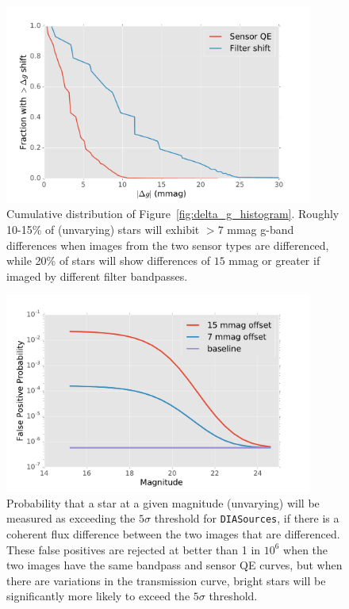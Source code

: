 \documentclass[12pt]{article}
\newcommand{\code}[1]{\texttt{#1}}
\newcommand{\DIASources}{\code{DIASources}\xspace}
\begin{document}
\begin{figure}
\includegraphics[width=0.9\textwidth]{figures/delta_g_cumulative.pdf}
\caption{Cumulative distribution of Figure~\ref{fig:delta_g_histogram}. Roughly
10-15\% of (unvarying) stars will exhibit $>7$ mmag g-band differences when
images from the two sensor types are differenced, while 20\% of stars will show
differences of $15$ mmag or greater if imaged by different filter bandpasses.
\label{fig:delta_g_cumulative}}
\end{figure}


\begin{figure}
\includegraphics[width=0.9\textwidth]{figures/false_positive_prob.pdf}
\caption{Probability that a star at a given magnitude (unvarying) will be
measured as exceeding the $5\sigma$ threshold for \DIASources, if there is a
coherent flux difference between the two images that are differenced. These
false positives are rejected at better than 1 in $10^6$ when the two images have
the same bandpass and sensor QE curves, but when there are variations in the
transmission curve, bright stars will be significantly more likely to exceed the
$5\sigma$ threshold.
\label{fig:false_positive_prob}}
\end{figure}
\end{document}
